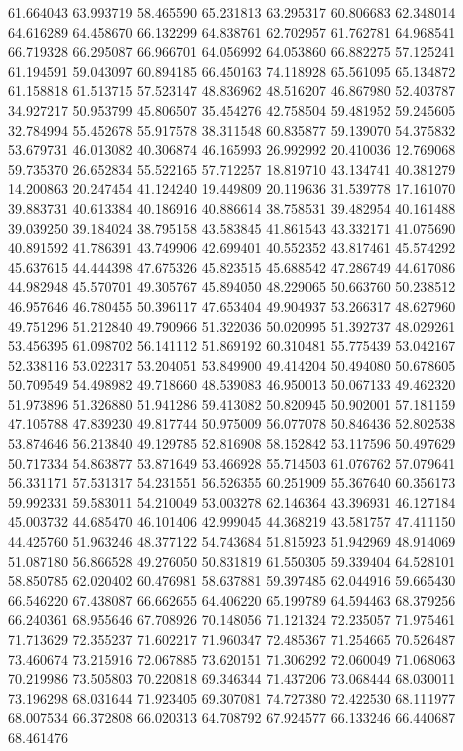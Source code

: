 61.664043
63.993719
58.465590
65.231813
63.295317
60.806683
62.348014
64.616289
64.458670
66.132299
64.838761
62.702957
61.762781
64.968541
66.719328
66.295087
66.966701
64.056992
64.053860
66.882275
57.125241
61.194591
59.043097
60.894185
66.450163
74.118928
65.561095
65.134872
61.158818
61.513715
57.523147
48.836962
48.516207
46.867980
52.403787
34.927217
50.953799
45.806507
35.454276
42.758504
59.481952
59.245605
32.784994
55.452678
55.917578
38.311548
60.835877
59.139070
54.375832
53.679731
46.013082
40.306874
46.165993
26.992992
20.410036
12.769068
59.735370
26.652834
55.522165
57.712257
18.819710
43.134741
40.381279
14.200863
20.247454
41.124240
19.449809
20.119636
31.539778
17.161070
39.883731
40.613384
40.186916
40.886614
38.758531
39.482954
40.161488
39.039250
39.184024
38.795158
43.583845
41.861543
43.332171
41.075690
40.891592
41.786391
43.749906
42.699401
40.552352
43.817461
45.574292
45.637615
44.444398
47.675326
45.823515
45.688542
47.286749
44.617086
44.982948
45.570701
49.305767
45.894050
48.229065
50.663760
50.238512
46.957646
46.780455
50.396117
47.653404
49.904937
53.266317
48.627960
49.751296
51.212840
49.790966
51.322036
50.020995
51.392737
48.029261
53.456395
61.098702
56.141112
51.869192
60.310481
55.775439
53.042167
52.338116
53.022317
53.204051
53.849900
49.414204
50.494080
50.678605
50.709549
54.498982
49.718660
48.539083
46.950013
50.067133
49.462320
51.973896
51.326880
51.941286
59.413082
50.820945
50.902001
57.181159
47.105788
47.839230
49.817744
50.975009
56.077078
50.846436
52.802538
53.874646
56.213840
49.129785
52.816908
58.152842
53.117596
50.497629
50.717334
54.863877
53.871649
53.466928
55.714503
61.076762
57.079641
56.331171
57.531317
54.231551
56.526355
60.251909
55.367640
60.356173
59.992331
59.583011
54.210049
53.003278
62.146364
43.396931
46.127184
45.003732
44.685470
46.101406
42.999045
44.368219
43.581757
47.411150
44.425760
51.963246
48.377122
54.743684
51.815923
51.942969
48.914069
51.087180
56.866528
49.276050
50.831819
61.550305
59.339404
64.528101
58.850785
62.020402
60.476981
58.637881
59.397485
62.044916
59.665430
66.546220
67.438087
66.662655
64.406220
65.199789
64.594463
68.379256
66.240361
68.955646
67.708926
70.148056
71.121324
72.235057
71.975461
71.713629
72.355237
71.602217
71.960347
72.485367
71.254665
70.526487
73.460674
73.215916
72.067885
73.620151
71.306292
72.060049
71.068063
70.219986
73.505803
70.220818
69.346344
71.437206
73.068444
68.030011
73.196298
68.031644
71.923405
69.307081
74.727380
72.422530
68.111977
68.007534
66.372808
66.020313
64.708792
67.924577
66.133246
66.440687
68.461476
